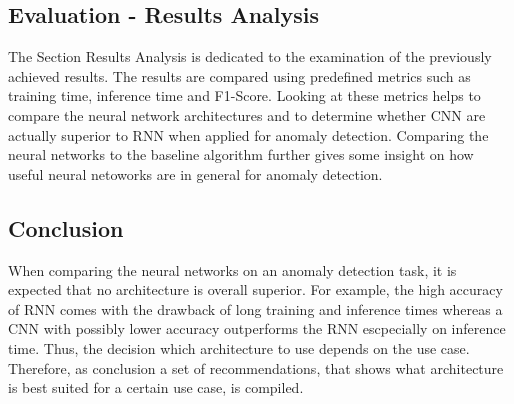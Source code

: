 \subsection{Evaluation - Results Analysis}
The Section Results Analysis is dedicated to the examination of the previously achieved results. The results are compared using predefined metrics such as training time, inference time and F1-Score. Looking at these metrics helps to compare the neural network architectures and to determine whether CNN are actually superior to RNN when applied for anomaly detection. Comparing the neural networks to the baseline algorithm further gives some insight on how useful neural netoworks are in general for anomaly detection.

\subsection{Conclusion}
When comparing the neural networks on an anomaly detection task, it is expected that no architecture is overall superior. For example, the high accuracy of RNN comes with the drawback of long training and inference times whereas a CNN with possibly lower accuracy outperforms the RNN escpecially on inference time. Thus, the decision which architecture to use depends on the use case. Therefore, as conclusion a set of recommendations, that shows what architecture is best suited for a certain use case, is compiled.


